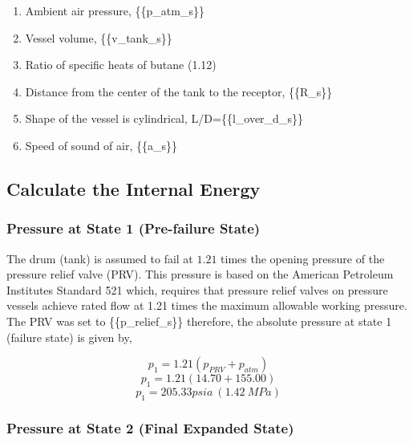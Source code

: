 \documentclass[10pt,parskip=half,
toc=sectionentrywithdots,
bibliography=totocnumbered,
captions=tableheading,numbers=noendperiod]{scrartcl}
\providecommand{\tightlist}{%
  \setlength{\itemsep}{0pt}\setlength{\parskip}{0pt}}
\begin{document}
\begin{enumerate}
\def\labelenumi{\arabic{enumi}.}
\tightlist
\item
  Ambient air pressure, \{\{p\_atm\_s\}\}
\item
  Vessel volume, \{\{v\_tank\_s\}\}
\item
  Ratio of specific heats of butane (1.12)
\item
  Distance from the center of the tank to the receptor, \{\{R\_s\}\}
\item
  Shape of the vessel is cylindrical, L/D=\{\{l\_over\_d\_s\}\}
\item
  Speed of sound of air, \{\{a\_s\}\}
\end{enumerate}

\hypertarget{calculate-the-internal-energy}{%
\subsection{Calculate the Internal
Energy}\label{calculate-the-internal-energy}}

\hypertarget{pressure-at-state-1-pre-failure-state}{%
\subsubsection{Pressure at State 1 (Pre-failure
State)}\label{pressure-at-state-1-pre-failure-state}}

The drum (tank) is assumed to fail at \(1.21\) times the opening
pressure of the pressure relief valve (PRV)\cite{Engineers2013}. This
pressure is based on the American Petroleum Institutes Standard 521
which, requires that pressure relief valves on pressure vessels achieve
rated flow at 1.21 times the maximum allowable working pressure. The PRV
was set to \{\{p\_relief\_s\}\} therefore, the absolute pressure at
state 1 (failure state) is given by,

\begin{equation}p_1 = 1.21\left(p_{PRV}+p_{atm}\right)\end{equation}
\begin{equation}p_1 = 1.21\left(14.70+155.00\right)\end{equation}
\begin{equation}p_1 = 205.33 psia\:(1.42\:MPa)\end{equation}

\hypertarget{pressure-at-state-2-final-expanded-state}{%
\subsubsection{Pressure at State 2 (Final Expanded
State)}\label{pressure-at-state-2-final-expanded-state}}
\end{document}
